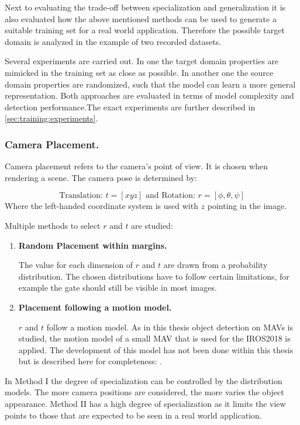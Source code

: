 Next to evaluating the trade-off between specialization and generalization it is also evaluated how the above mentioned methods can be used to generate a suitable training set for a real world application. Therefore the possible target domain is analyzed in the example of two recorded datasets. 

Several experiments are carried out. In one the target domain properties are mimicked in the training set as close as possible. In another one the source domain properties are randomized, such that the model can learn a more general representation. Both approaches are evaluated in terms of model complexity and detection performance.The exact experiments are further described in \autoref{sec:training:experiments}.

\subsubsection{Camera Placement.} 
	
Camera placement refers to the camera's point of view. It is chosen when rendering a scene. The camera pose is determined by:

$$
\text{Translation: }t = [x y z] \text{ and Rotation: } r = [\phi, \theta, \psi]
$$
Where the left-handed coordinate system is used with $z$ pointing in the image.

Multiple methods to select $r$ and $t$ are studied:

\begin{enumerate}
	\item \textbf{Random Placement within margins.}
		  
		  The value for each dimension of $r$ and $t$ are drawn from a probability distribution. The chosen distributions have to follow certain limitations, for example the gate should still be visible in most images.
		  
	\item \textbf{Placement following a motion model.}
	
		$r$ and $t$ follow a motion model. As in this thesis object detection on \acp{MAV} is studied, the motion model of a small \ac{MAV} that is used for the IROS2018 is applied. The development of this model has not been done within this thesis but is described here for completeness: .
	
\end{enumerate}
	
In Method I the degree of specialization can be controlled by the distribution models. The more camera positions are considered, the more varies the object appearance. Method II has a high degree of specialization as it limits the view points to those that are expected to be seen in a real world application.

